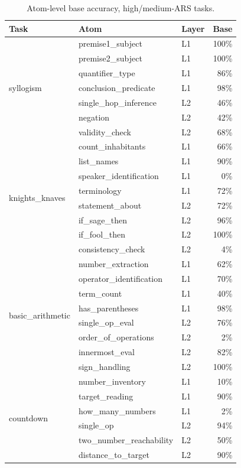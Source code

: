 \documentclass{article}
\begin{document}
\begin{table}[h]
\centering\small
\caption{Atom-level base accuracy, high/medium-ARS tasks.}
\begin{tabular}{lllr}
\toprule
Task & Atom & Layer & Base\\
\midrule
\multirow{7}{*}{syllogism}
 & premise1\_subject     & L1 & 100\%\\
 & premise2\_subject     & L1 & 100\%\\
 & quantifier\_type      & L1 & 86\%\\
 & conclusion\_predicate & L1 & 98\%\\
 & single\_hop\_inference& L2 & 46\%\\
 & negation              & L2 & 42\%\\
 & validity\_check       & L2 & 68\%\\
\midrule
\multirow{8}{*}{knights\_knaves}
 & count\_inhabitants    & L1 & 66\%\\
 & list\_names           & L1 & 90\%\\
 & speaker\_identification& L1 & 0\%\\
 & terminology           & L1 & 72\%\\
 & statement\_about      & L2 & 72\%\\
 & if\_sage\_then        & L2 & 96\%\\
 & if\_fool\_then        & L2 & 100\%\\
 & consistency\_check    & L2 & 4\%\\
\midrule
\multirow{8}{*}{basic\_arithmetic}
 & number\_extraction    & L1 & 62\%\\
 & operator\_identification& L1 & 70\%\\
 & term\_count           & L1 & 40\%\\
 & has\_parentheses      & L1 & 98\%\\
 & single\_op\_eval      & L2 & 76\%\\
 & order\_of\_operations & L2 & 2\%\\
 & innermost\_eval       & L2 & 82\%\\
 & sign\_handling        & L2 & 100\%\\
\midrule
\multirow{6}{*}{countdown}
 & number\_inventory     & L1 & 10\%\\
 & target\_reading       & L1 & 90\%\\
 & how\_many\_numbers    & L1 & 2\%\\
 & single\_op            & L2 & 94\%\\
 & two\_number\_reachability & L2 & 50\%\\
 & distance\_to\_target  & L2 & 90\%\\
\bottomrule
\end{tabular}
\end{table}
\end{document}
